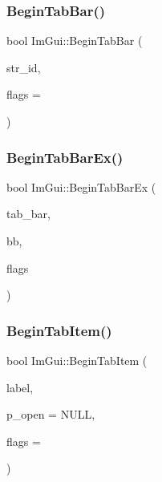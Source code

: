 \mbox{\label{namespaceImGui_ab930db04eeff13f78ae76382c52db7eb}} 
\subsubsection{\texorpdfstring{Begin\+Tab\+Bar()}{BeginTabBar()}}
{\footnotesize\ttfamily bool Im\+Gui\+::\+Begin\+Tab\+Bar (\begin{DoxyParamCaption}\item[{const char $\ast$}]{str\+\_\+id,  }\item[{Im\+Gui\+Tab\+Bar\+Flags}]{flags = {} }\end{DoxyParamCaption})}

\mbox{\label{namespaceImGui_ae630dd2237aa12e9a306af817d8996c3}} 
\subsubsection{\texorpdfstring{Begin\+Tab\+Bar\+Ex()}{BeginTabBarEx()}}
{\footnotesize\ttfamily bool Im\+Gui\+::\+Begin\+Tab\+Bar\+Ex (\begin{DoxyParamCaption}\item[{\hyperlink{structImGuiTabBar}{Im\+Gui\+Tab\+Bar} $\ast$}]{tab\+\_\+bar,  }\item[{const \hyperlink{structImRect}{Im\+Rect} \&}]{bb,  }\item[{Im\+Gui\+Tab\+Bar\+Flags}]{flags }\end{DoxyParamCaption})}

\mbox{\label{namespaceImGui_a4cee1ccc9018a298cfff90a704bde8ca}} 
\subsubsection{\texorpdfstring{Begin\+Tab\+Item()}{BeginTabItem()}}
{\footnotesize\ttfamily bool Im\+Gui\+::\+Begin\+Tab\+Item (\begin{DoxyParamCaption}\item[{const char $\ast$}]{label,  }\item[{bool $\ast$}]{p\+\_\+open = {\ttfamily NULL},  }\item[{Im\+Gui\+Tab\+Item\+Flags}]{flags = {} }\end{DoxyParamCaption})}

